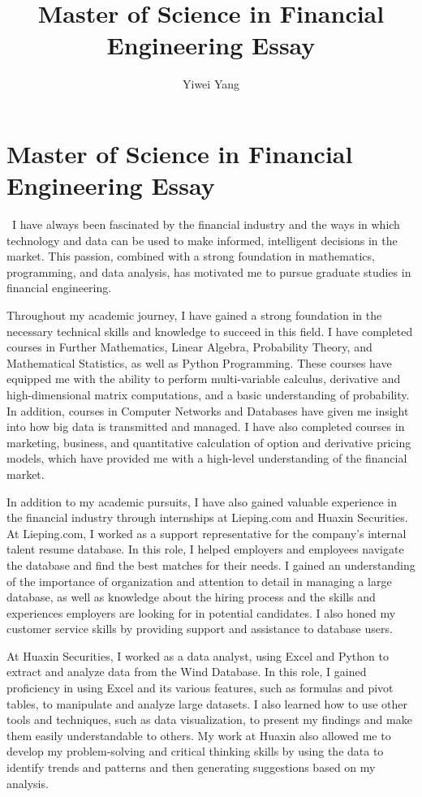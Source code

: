 \documentclass[a4paper,english]{article}
\title{Master of Science in Financial Engineering Essay}
\author{Yiwei Yang}
\def\centersec#1{\centering#1} %
\begin{document}
\section*{\centersec{Master of Science in Financial Engineering Essay}}
\quad \ I have always been fascinated by the financial industry and the ways in which technology and data can be used to make informed, intelligent decisions in the market. This passion, combined with a strong foundation in mathematics, programming, and data analysis, has motivated me to pursue graduate studies in financial engineering.

Throughout my academic journey, I have gained a strong foundation in the necessary technical skills and knowledge to succeed in this field. I have completed courses in Further Mathematics, Linear Algebra, Probability Theory, and Mathematical Statistics, as well as Python Programming. These courses have equipped me with the ability to perform multi-variable calculus, derivative and high-dimensional matrix computations, and a basic understanding of probability. In addition, courses in Computer Networks and Databases have given me insight into how big data is transmitted and managed. I have also completed courses in marketing, business, and quantitative calculation of option and derivative pricing models, which have provided me with a high-level understanding of the financial market.

In addition to my academic pursuits, I have also gained valuable experience in the financial industry through internships at Lieping.com and Huaxin Securities. At Lieping.com, I worked as a support representative for the company's internal talent resume database. In this role, I helped employers and employees navigate the database and find the best matches for their needs. I gained an understanding of the importance of organization and attention to detail in managing a large database, as well as knowledge about the hiring process and the skills and experiences employers are looking for in potential candidates. I also honed my customer service skills by providing support and assistance to database users.

At Huaxin Securities, I worked as a data analyst, using Excel and Python to extract and analyze data from the Wind Database. In this role, I gained proficiency in using Excel and its various features, such as formulas and pivot tables, to manipulate and analyze large datasets. I also learned how to use other tools and techniques, such as data visualization, to present my findings and make them easily understandable to others. My work at Huaxin also allowed me to develop my problem-solving and critical thinking skills by using the data to identify trends and patterns and then generating suggestions based on my analysis.
\end{document}
